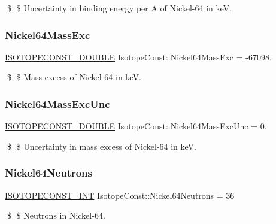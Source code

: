 \$ \$ Uncertainty in binding energy per A of Nickel-\/64 in keV. \mbox{\label{group___isotope_const-_nickel-_ni64_gaa3bcaf52f6e7534cb27b7cb7c7974dd4}} 
\subsubsection{\texorpdfstring{Nickel64\+Mass\+Exc}{Nickel64MassExc}}
{\footnotesize\ttfamily \mbox{\hyperlink{group___isotope_const-_macros_ga8f45a7272ce02c0b4c65c44636ed719a}{I\+S\+O\+T\+O\+P\+E\+C\+O\+N\+S\+T\+\_\+\+D\+O\+U\+B\+LE}} Isotope\+Const\+::\+Nickel64\+Mass\+Exc = -\/67098.}

\$ \$ Mass excess of Nickel-\/64 in keV. \mbox{\label{group___isotope_const-_nickel-_ni64_ga29a4d7d6b2fab1b2e21822d1b9114910}} 
\subsubsection{\texorpdfstring{Nickel64\+Mass\+Exc\+Unc}{Nickel64MassExcUnc}}
{\footnotesize\ttfamily \mbox{\hyperlink{group___isotope_const-_macros_ga8f45a7272ce02c0b4c65c44636ed719a}{I\+S\+O\+T\+O\+P\+E\+C\+O\+N\+S\+T\+\_\+\+D\+O\+U\+B\+LE}} Isotope\+Const\+::\+Nickel64\+Mass\+Exc\+Unc = 0.}

\$ \$ Uncertainty in mass excess of Nickel-\/64 in keV. \mbox{\label{group___isotope_const-_nickel-_ni64_ga496d29b647b53cfa1e313702ea62d114}} 
\subsubsection{\texorpdfstring{Nickel64\+Neutrons}{Nickel64Neutrons}}
{\footnotesize\ttfamily \mbox{\hyperlink{group___isotope_const-_macros_ga5f18360b3e99483a35c32d789e62621c}{I\+S\+O\+T\+O\+P\+E\+C\+O\+N\+S\+T\+\_\+\+I\+NT}} Isotope\+Const\+::\+Nickel64\+Neutrons = 36}

\$ \$ Neutrons in Nickel-\/64. \mbox{\label{group___isotope_const-_nickel-_ni64_gaa7fc5b064f154171e2461d7bc8cd5001}} 
